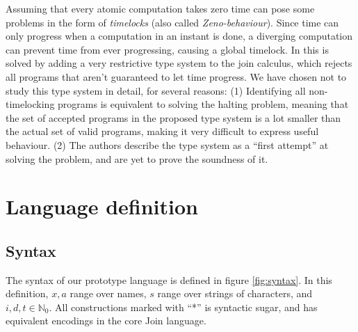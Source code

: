 Assuming that every atomic computation takes zero time can pose some
problems in the form of \emph{timelocks} (also called
\emph{Zeno-behaviour}). Since time can only progress when a
computation in an instant is done, a diverging computation can prevent
time from ever progressing, causing a global timelock.  In
\cite{timed-join} this is solved by adding a very restrictive type
system to the join calculus, which rejects all programs that aren't
guaranteed to let time progress. We have chosen not to study this type
system in detail, for several reasons: (1) Identifying all
non-timelocking programs is equivalent to solving the halting problem,
meaning that the set of accepted programs in the proposed type system
is a lot smaller than the actual set of valid programs, making it very
difficult to express useful behaviour. (2) The authors describe the
type system as a ``first attempt'' at solving the problem, and are yet
to prove the soundness of it.


\section{Language definition}

\subsection{Syntax}

The syntax of our prototype language is defined in figure \ref{fig:syntax}. In
this definition, $x,a$ range over names, $s$ range over strings of characters,
and $i,d,t \in \mathbb{N}_0$. All constructions marked with ``*'' is syntactic
sugar, and has equivalent encodings in the core Join language.

